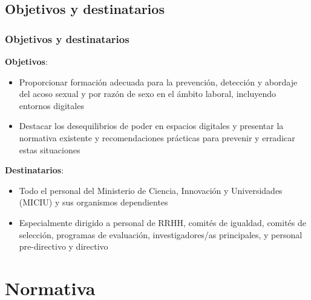 \documentclass{beamer}
\begin{document}
    \subsection{Objetivos y destinatarios}
    \begin{frame}
        \frametitle{Objetivos y destinatarios}
        \textbf{Objetivos}:
        \begin{itemize}
            \item Proporcionar formación adecuada para la prevención, detección y abordaje del acoso sexual y por razón de sexo en el ámbito laboral, incluyendo entornos digitales
            \item Destacar los desequilibrios de poder en espacios digitales y presentar la normativa existente y recomendaciones prácticas para prevenir y erradicar estas situaciones
        \end{itemize}
        \textbf{Destinatarios}:
        \begin{itemize}
            \item Todo el personal del Ministerio de Ciencia, Innovación y Universidades (MICIU) y sus organismos dependientes
            \item Especialmente dirigido a personal de RRHH, comités de igualdad, comités de selección, programas de evaluación, investigadores/as principales, y personal pre-directivo y directivo
        \end{itemize}
    \end{frame}


    \section{Normativa}
\end{document}
